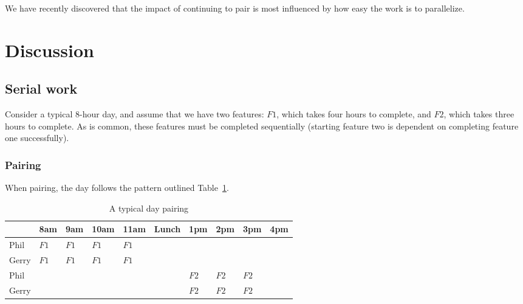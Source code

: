 \documentclass[letterpaper]{article}
\theoremstyle{definition}
\begin{document}
    We have recently discovered that the impact of continuing to pair is most influenced by how easy the work is to
    parallelize.


    \section{Discussion}\label{sec:discussion}

    \subsection{Serial work}\label{subsec:serial-work}

    Consider a typical 8-hour day, and assume that we have two features: $F1$, which takes four hours to complete, and
    $F2$, which takes three hours to complete.
    As is common, these features must be completed sequentially (starting feature two is dependent on completing feature
    one successfully).

    \subsubsection{Pairing}\label{subsubsec:serial-pairing}

    When pairing, the day follows the pattern outlined Table~\ref{tab:serial-pair}.

    \begin{table}[h]
        \centering
        \tiny
        \begin{tabular}{ |l|l|l|l|l|l|l|l|l|l| }
            \hline
            & 8am                     & 9am                     & 10am                    & 11am                    & Lunch & 1pm                    & 2pm                    & 3pm                    & 4pm \\
            \hline
            Phil  & \cellcolor{blue!10}$F1$ & \cellcolor{blue!10}$F1$ & \cellcolor{blue!10}$F1$ & \cellcolor{blue!10}$F1$ &       &      &      &      &     \\
            \hline
            Gerry & \cellcolor{blue!10}$F1$ & \cellcolor{blue!10}$F1$ & \cellcolor{blue!10}$F1$ & \cellcolor{blue!10}$F1$ &       &      &      &      &     \\
            \hline
            Phil  &                         &                         &                         &                         &       & \cellcolor{red!10}$F2$ & \cellcolor{red!10}$F2$ & \cellcolor{red!10}$F2$ &     \\
            \hline
            Gerry &                         &                         &                         &                         &       & \cellcolor{red!10}$F2$ & \cellcolor{red!10}$F2$ & \cellcolor{red!10}$F2$ &     \\
            \hline
        \end{tabular}
        \caption{A typical day pairing}
        \label{tab:serial-pair}
    \end{table}
\end{document}
